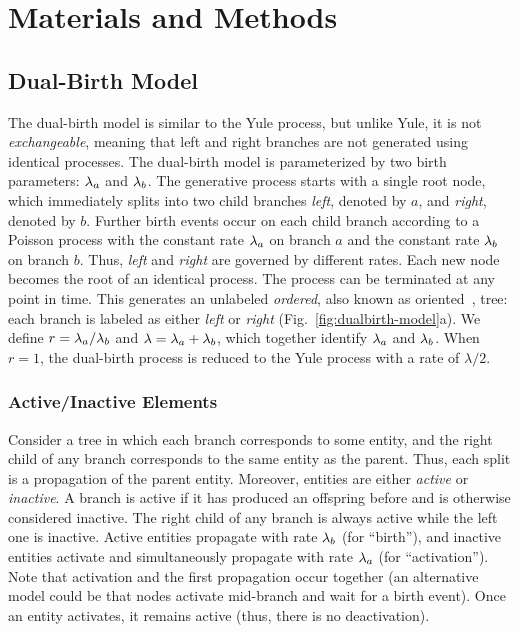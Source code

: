 \section{Materials and Methods}
\subsection{Dual-Birth Model}
The dual-birth model is similar to the Yule process, but unlike Yule, it is not \textit{exchangeable}, meaning that left and right branches are not generated using identical processes. The dual-birth model is parameterized by two birth parameters: $\lambda_a$ and $\lambda_b$. The generative process starts with a single root node, which immediately splits into two child branches \textit{left}, denoted by $a$,  and \textit{right}, denoted by $b$. Further birth events occur on each child branch according to a Poisson process with the constant rate $\lambda_a$ on branch $a$ and the constant rate $\lambda_b$ on branch $b$. Thus, \textit{left} and \textit{right} are governed by different rates. Each new node becomes the root of an identical process. The process can be terminated at any point in time. This generates an unlabeled \textit{ordered}, also known as oriented~\cite{Lambert2013}, tree: each branch is labeled as either \textit{left} or \textit{right} (Fig.~\ref{fig:dualbirth-model}a). We define $r=\lambda_a/\lambda_b$ and $\lambda=\lambda_a+\lambda_b$, which together identify $\lambda_a$ and $\lambda_b$. When $r=1$, the dual-birth process is reduced to the Yule process
with a rate of $\lambda/2$.

\subsubsection{Active/Inactive Elements}
Consider a tree in which each branch corresponds to some entity, and the right child of any branch corresponds to the same entity as the parent. Thus, each split is a propagation of the parent entity. Moreover, entities are either \textit{active} or \textit{inactive}. A branch is active if it has produced an offspring before and is otherwise considered inactive. The right child of any branch is always active while the left one is  inactive. Active entities  propagate with rate $\lambda_b$ (for ``birth''), and inactive entities activate and simultaneously propagate with rate $\lambda_a$ (for ``activation''). Note that activation and the first propagation occur together (an alternative model could be that nodes activate mid-branch and wait for a birth event). Once an entity activates, it remains active (thus, there is no deactivation).

